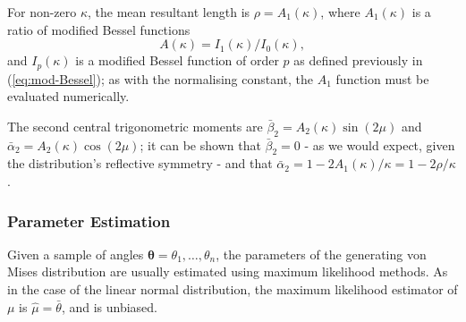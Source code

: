 \documentclass[../../ArchStats.tex]{subfiles}
\begin{document}

For non-zero $\kappa$, the mean resultant length is $\rho = A_1(\kappa)$, where $A_1(\kappa)$ is a ratio of modified Bessel functions
\[A(\kappa) = I_1(\kappa)/I_0(\kappa),\]
and $I_p(\kappa)$ is a modified Bessel function of order $p$ as defined previously in (\ref{eq:mod-Bessel}); as with the normalising constant, the $A_1$ function must be evaluated numerically. 

The second central trigonometric moments are $\bar{\beta}_2 = A_2(\kappa) \sin(2\mu)$ and $\bar{\alpha}_2 = A_2(\kappa) \cos(2\mu)$; it can be shown that $\bar{\beta}_2 = 0$ - as we would expect, given the distribution's reflective symmetry - and that $\bar{\alpha}_2 = 1 - 2A_1(\kappa)/\kappa = 1-2\rho/\kappa$.




\subsubsection{Parameter Estimation}

Given a sample of angles $\boldsymbol{\theta} = \theta_1, \dots, \theta_n$,  the parameters of the generating von Mises distribution are usually estimated using maximum likelihood methods. As in the case of the linear normal distribution, the maximum likelihood estimator of $\mu$ is $\hat{\mu} = \bar{\theta}$, and is unbiased.
\end{document}
